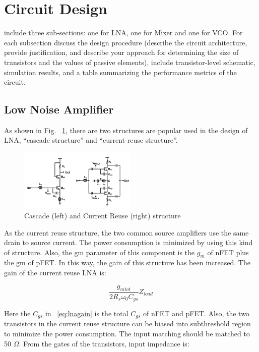 \section{Circuit Design}
include three sub-sections: one for LNA, one for Mixer and one for VCO. For each subsection discuss the design procedure (describe the circuit architecture, provide justification, and describe your approach for determining the size of transistors and the values of passive elements), include transistor-level schematic, simulation results, and a table summarizing the performance metrics of the circuit.

\subsection{Low Noise Amplifier}
As shown in Fig. ~\ref{fig:lna}, there are two structures are popular used in the design of LNA, “cascade structure” and “current-reuse structure”. 

\begin{figure}[h]
   \centering
    \includegraphics[width=0.5\textwidth]{figures/LNA.png}
    \caption{Cascade (left) and Current Reuse (right) structure ~\cite{lna}}
    \label{fig:lna}
\end{figure}

As the current reuse structure, the two common source amplifiers use the same drain to source current. The power consumption is minimized by using this kind of structure. Also, the gm parameter of this component is the $g_m$ of nFET plus the gm of pFET. In this way, the gain of this structure has been increased. The gain of the current reuse LNA is:

\begin{equation} 
  	\frac{g_{mtot}}{2R_s \omega_0 C_{gs}}Z_{load}
	\label{eq:lnagain}
\end{equation}

Here the $C_{gs}$ in ~\ref{eq:lnagain} is the total $C_{gs}$ of nFET and pFET. Also, the two transistors in the current reuse structure can be biased into subthreshold region to minimize the power consumption. The input matching should be matched to 50 $\Omega$. From the gates of the transistors, input impedance is:

